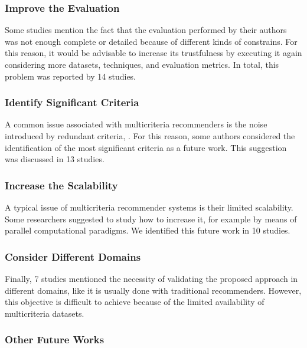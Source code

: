 \subsubsection{Improve the Evaluation}

Some studies mention the fact that the evaluation performed by their authors was not enough complete or detailed because of different kinds of constrains. For this reason, it would be advisable to increase its trustfulness by executing it again considering more datasets, techniques, and evaluation metrics. In total, this problem was reported by 14 studies.

\subsubsection{Identify Significant Criteria}

A common issue associated with multicriteria recommenders is the noise introduced by redundant criteria, . For this reason, some authors considered the identification of the most significant criteria as a future work. This suggestion was discussed in 13 studies.

\subsubsection{Increase the Scalability}

A typical issue of multicriteria recommender systems is their limited scalability.  Some researchers suggested to study how to increase it, for example by means of parallel computational paradigms. We identified this future work in 10 studies.

\subsubsection{Consider Different Domains}

Finally, 7 studies mentioned the necessity of validating the proposed approach in different domains, like it is usually done with traditional recommenders. However, this objective is difficult to achieve because of the limited availability of multicriteria datasets.

\subsubsection{Other Future Works}

